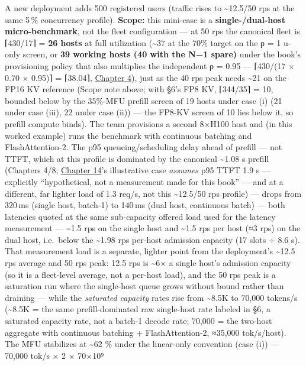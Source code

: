 A new deployment adds 500 registered users (traffic rises to
\textasciitilde12.5/50 rps at the same 5\,\% concurrency profile).
\textbf{Scope:} this mini-case is a \textbf{single-/dual-host
micro-benchmark}, not the fleet configuration --- at 50 rps the
canonical fleet is ⌈430/17⌉ = \textbf{26 hosts} at full utilization
(\textasciitilde37 at the 70\% target on the ρ = 1 u-only screen, or
\textbf{39 working hosts (40 with the N−1 spare)} under the book's
provisioning policy that also multiplies the independent ρ = 0.95 ---
⌈430/(17 × 0.70 × 0.95)⌉ = ⌈38.04⌉, \hyperref[chap:4]{Chapter 4}), just as the 40 rps peak
needs \textasciitilde21 on the FP16 KV reference (Scope note above; with
§6's FP8 KV, ⌈344/35⌉ = 10, bounded below by the 35\%-MFU prefill screen
of 19 hosts under case (i) (21 under case (iii), 22 under case (ii)) ---
the FP8-KV screen of 10 lies below it, so prefill compute binds). The
team provisions a second 8×H100 host and (in this worked example) runs
the benchmark with continuous batching and FlashAttention‑2. The p95
queueing/scheduling delay ahead of prefill --- not TTFT, which at this
profile is dominated by the canonical \textasciitilde1.08 s prefill
(Chapters 4/8; \hyperref[chap:14]{Chapter 14}'s illustrative case \emph{assumes} p95 TTFT
1.9 s --- explicitly ``hypothetical, not a measurement made for this
book'' --- and at a different, far lighter load of 1.3 req/s, not this
\textasciitilde12.5/50 rps profile) --- drops from 320\,ms (single host,
batch‑1) to 140\,ms (dual host, continuous batch) --- both latencies
quoted at the same sub‑capacity offered load used for the latency
measurement --- \textasciitilde1.5 rps on the single host and
\textasciitilde1.5 rps per host (≈3 rps) on the dual host, i.e.~below
the \textasciitilde1.98 rps per-host admission capacity (17 slots ÷ 8.6
s). That measurement load is a separate, lighter point from the
deployment's \textasciitilde12.5 rps average and 50 rps peak: 12.5 rps
is \textasciitilde6× a single host's admission capacity (so it is a
fleet-level average, not a per-host load), and the 50 rps peak is a
saturation run where the single-host queue grows without bound rather
than draining --- while the \emph{saturated capacity} rates rise from
\textasciitilde8.5K to 70,000 tokens/s (\textasciitilde8.5K = the same
prefill-dominated raw single-host rate labeled in §6, a saturated
capacity rate, not a batch‑1 decode rate; 70,000 = the two-host
aggregate with continuous batching + FlashAttention‑2, ≈35,000
tok/s/host). The MFU stabilizes at \textasciitilde62 \% under the
linear-only convention (case (i)) --- 70,000 tok/s × 2 × 70×10⁹
